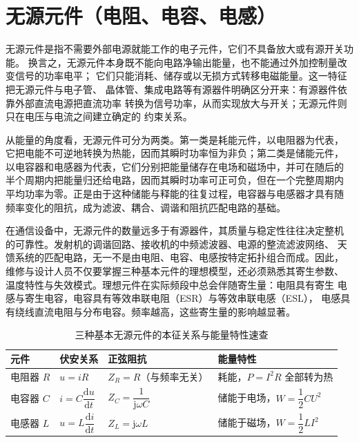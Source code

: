 
\section{无源元件（电阻、电容、电感）}
\label{sec:passive_components}

无源元件是指不需要外部电源就能工作的电子元件，它们不具备放大或有源开关功能。
换言之，无源元件本身既不能向电路净输出能量，也不能通过外加控制量改变信号的功率电平；
它们只能消耗、储存或以无损方式转移电磁能量。这一特征把无源元件与电子管、
晶体管、集成电路等有源器件明确区分开来：有源器件依靠外部直流电源把直流功率
转换为信号功率，从而实现放大与开关；无源元件则只在电压与电流之间建立确定的
约束关系。

从能量的角度看，无源元件可分为两类。第一类是耗能元件，以电阻器为代表，
它把电能不可逆地转换为热能，因而其瞬时功率恒为非负；第二类是储能元件，
以电容器和电感器为代表，它们分别把能量储存在电场和磁场中，并可在随后的
半个周期内把能量归还给电路，因而其瞬时功率可正可负，但在一个完整周期内
平均功率为零。正是由于这种储能与释能的往复过程，电容器与电感器才具有随
频率变化的阻抗，成为滤波、耦合、调谐和阻抗匹配电路的基础。

在通信设备中，无源元件的数量远多于有源器件，其质量与稳定性往往决定整机
的可靠性。发射机的调谐回路、接收机的中频滤波器、电源的整流滤波网络、
天馈系统的匹配电路，无一不是由电阻、电容、电感按特定拓扑组合而成。因此，
维修与设计人员不仅要掌握三种基本元件的理想模型，还必须熟悉其寄生参数、
温度特性与失效模式。理想元件在实际频段中总会伴随寄生量：电阻具有寄生
电感与寄生电容，电容具有等效串联电阻（ESR）与等效串联电感（ESL），
电感具有绕线直流电阻与分布电容。频率越高，这些寄生量的影响越显著。

\begin{table}[htbp]
\centering
\caption{三种基本无源元件的本征关系与能量特性速查}
\begin{tabular}{|p{2.0cm}|p{3.0cm}|p{3.2cm}|p{3.4cm}|}
\hline
\textbf{元件} & \textbf{伏安关系} & \textbf{正弦阻抗} & \textbf{能量特性} \\
\hline
电阻器 $R$ & $u = iR$ & $Z_R = R$（与频率无关） & 耗能，$P = I^2R$ 全部转为热 \\
\hline
电容器 $C$ & $i = C\dfrac{\mathrm{d}u}{\mathrm{d}t}$ & $Z_C = \dfrac{1}{\mathrm{j}\omega C}$ & 储能于电场，$W = \dfrac{1}{2}CU^2$ \\
\hline
电感器 $L$ & $u = L\dfrac{\mathrm{d}i}{\mathrm{d}t}$ & $Z_L = \mathrm{j}\omega L$ & 储能于磁场，$W = \dfrac{1}{2}LI^2$ \\
\hline
\end{tabular}
\end{table}

